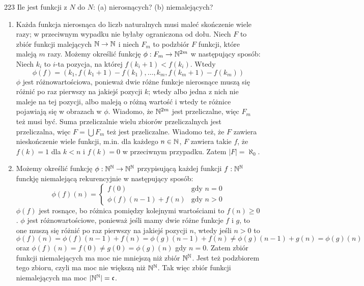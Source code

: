 \documentclass{../note}
\begin{document}
\begin{zadanie}{223}
Ile jest funkcji z $N$ do $N$: (a) nierosnących? (b) niemalejących?
\end{zadanie}
\begin{rozwiazanie}
\begin{enumerate}[label=(\alph*)]
    \item Każda funkcja nierosnąca do liczb naturalnych musi maleć skończenie wiele razy; w przeciwnym wypadku nie byłaby ograniczona od dołu. Niech $F$ to zbiór funkcji malejących $\mathbb{N} \to \mathbb{N}$ i niech $F_m$ to podzbiór $F$ funkcji, które maleją $m$ razy. Możemy określić funkcję $\phi : F_m \to \mathbb{N}^{2m}$ w następujący sposób: Niech $k_i$ to $i$-ta pozycja, na której $f(k_i + 1) < f(k_i)$. Wtedy 
    \[\phi(f) = (k_1, f(k_1 + 1) - f(k_1), \ldots, k_m, f(k_m + 1) - f(k_m))\]
    $\phi$ jest różnowartościowa, ponieważ dwie różne funkcje nierosnące muszą się różnić po raz pierwszy na jakiejś pozycji $k$; wtedy albo jedna z nich nie maleje na tej pozycji, albo maleją o różną wartość i wtedy te różnice pojawiają się w obrazach w $\phi$. Wiadomo, że $\mathbb{N}^{2m}$ jest przeliczalne, więc $F_m$ też musi być. Suma przeliczalnie wielu zbiorów przeliczalnych jest przeliczalna, więc $F = \bigcup F_m$ też jest przeliczalne. Wiadomo też, że $F$ zawiera nieskończenie wiele funkcji, m.in. dla każdego $n \in \mathbb{N}$, $F$ zawiera takie $f$, że $f(k) = 1$ dla $k < n$ i $f(k) = 0$ w przeciwnym przypadku. Zatem $|F| = \aleph_0$.
    
    \item Możemy określić funkcję $\phi : \mathbb{N}^{\mathbb{N}} \to \mathbb{N}^{\mathbb{N}}$ przypisującą każdej funkcji $f : \mathbb{N}^{\mathbb{N}}$ funckję niemalejącą rekurencyjnie w następujący sposób:
    \[\phi(f)(n) = \begin{cases}
        f(0) & \text{gdy } n = 0\\
        \phi(f)(n-1) + f(n) & \text{gdy } n > 0
    \end{cases}\]
    $\phi(f)$ jest rosnące, bo różnica pomiędzy kolejnymi wartościami to $f(n) \geq 0$. $\phi$ jest różnowartościowe, ponieważ jeśli mamy dwie różne funkcje $f$ i $g$, to one muszą się różnić po raz pierwszy na jakiejś pozycji $n$, wtedy jeśli $n > 0$ to \[\phi(f)(n) = \phi(f)(n-1) + f(n) = \phi(g)(n-1) + f(n) \neq \phi(g)(n-1) + g(n) = \phi(g)(n)\]
    oraz $\phi(f)(n) = f(0) \neq g(0) = \phi(g)(n)$ gdy $n = 0$. Zatem zbiór funkcji niemalejących ma moc nie mniejszą niż zbiór $\mathbb{N}^{\mathbb{N}}$. Jest też podzbiorem tego zbioru, czyli ma moc nie większą niż $\mathbb{N}^{\mathbb{N}}$. Tak więc zbiór funkcji niemalejących ma moc $|\mathbb{N}^{\mathbb{N}}| = \mathfrak{c}$.
\end{enumerate}
\end{rozwiazanie}
\end{document}

